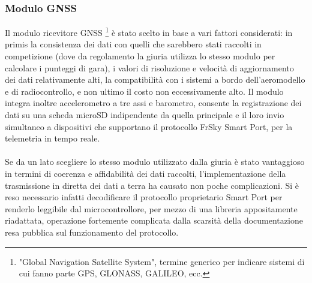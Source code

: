\documentclass[12pt]{article}
\begin{document}
\subsubsection{Modulo GNSS}
Il modulo ricevitore GNSS \footnote{"Global Navigation Satellite System", termine generico per indicare sistemi di cui fanno parte GPS, GLONASS, GALILEO, ecc.} è stato scelto in base a vari fattori considerati: in primis la consistenza dei dati con quelli che sarebbero stati raccolti in competizione (dove da regolamento la giuria utilizza lo stesso modulo per calcolare i punteggi di gara), i valori di risoluzione e velocità di aggiornamento dei dati relativamente alti, la compatibilità con i sistemi a bordo dell'aeromodello e di radiocontrollo, e non ultimo il costo non eccessivamente alto. Il modulo integra inoltre accelerometro a tre assi e barometro, consente la registrazione dei dati su una scheda microSD indipendente da quella principale e il loro invio simultaneo a dispositivi che supportano il protocollo FrSky Smart Port, per la telemetria in tempo reale.
\\\\
Se da un lato scegliere lo stesso modulo utilizzato dalla giuria è stato vantaggioso in termini di coerenza e affidabilità dei dati raccolti, l'implementazione della trasmissione in diretta dei dati a terra ha causato non poche complicazioni. Si è reso necessario infatti decodificare il protocollo proprietario Smart Port per renderlo leggibile dal microcontrollore, per mezzo di una libreria appositamente riadattata, operazione fortemente complicata dalla scarsità della documentazione resa pubblica sul funzionamento del protocollo.
\end{document}
